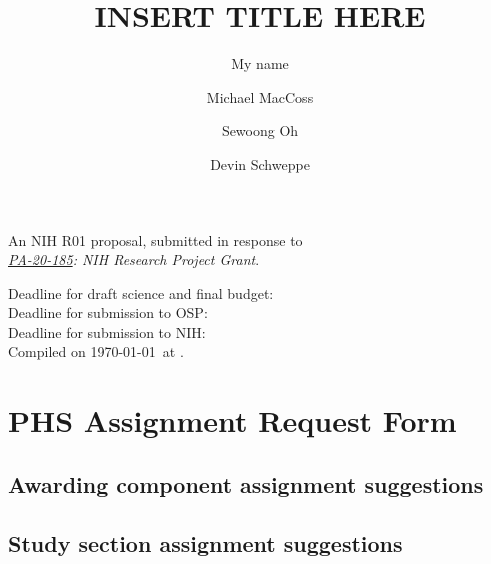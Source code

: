 \documentclass[12pt]{article}
\title{INSERT TITLE HERE}
\author[1]{My name}
\author[1]{Michael MacCoss}
\author[2]{Sewoong Oh}
\author[1]{Devin Schweppe}
\affil[1]{My affiliation}
\date{}
\newcommand{\instructions}[1]{}
\begin{document}
\maketitle

\begin{center}
An NIH R01 proposal, submitted in response to \\
{\em \href{https://grants.nih.gov/grants/guide/pa-files/PA-20-185.html}{PA-20-185}: NIH Research Project Grant}.
\end{center}

\vfill

\noindent
Deadline for draft science and final budget: \\
Deadline for submission to OSP: \\
Deadline for submission to NIH: \\

{\scriptsize Compiled on \today\ at \currenttime.}

\maketitle

\clearpage
\section*{PHS Assignment Request Form}

\subsection*{Awarding component assignment suggestions}

\instructions{If you have a suggestion for an awarding component (e.g., NIH Institute/Center) assignment, use the link below to identify the appropriate short abbreviation (e.g., ``NCI'' for National
  Cancer Institute) and enter it below in the boxes for ``Suggested Awarding Components''. All suggestions will be considered; however, not all assignment suggestions can be honored.

  Information about Awarding Component can be found here: \url{https://grants.nih.gov/grants/phs_assignment_information.htm#AwardingComponents}}

\subsection*{Study section assignment suggestions}
\end{document}
